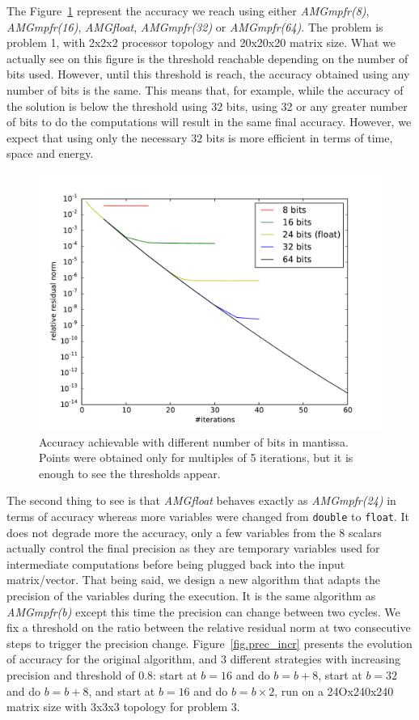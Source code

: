 \documentclass[sigplan]{acmart}
\begin{document}
   The Figure~\ref{fig.bits_accuracy} represent the accuracy we reach using either \emph{AMGmpfr(8)}, \emph{AMGmpfr(16)}, \emph{AMGfloat}, \emph{AMGmpfr(32)} or \emph{AMGmpfr(64)}. The problem is problem 1, with 2x2x2 processor topology and 20x20x20 matrix size.
   What we actually see on this figure is the threshold reachable depending on the number of bits used. However, until this threshold is reach, the accuracy obtained using any number of bits is the same. This means that, for example,
   while the accuracy of the solution is below the threshold using 32 bits, using 32 or any greater number of bits to do the computations will result in the same final accuracy. However, we expect that using only the necessary $32$ bits is 
   more efficient in terms of time, space and energy.
   
   \begin{figure} \centering
    \includegraphics[width=0.8\linewidth]{figs/bits_convergence.pdf}
    \caption{Accuracy achievable with different number of bits in mantissa. Points were obtained only for multiples of 5 iterations, but it is enough to see the thresholds appear.}
    \label{fig.bits_accuracy}
   \end{figure}
   
   The second thing to see is that \emph{AMGfloat} behaves exactly as \emph{AMGmpfr(24)} in terms of accuracy whereas more variables were changed from \texttt{double} to \texttt{float}. It does not degrade more the accuracy, only a few variables
   from the 8 scalars actually control the final precision as they are temporary variables used for intermediate computations before being plugged back into the input matrix/vector.
   That being said, we design a new algorithm that adapts the precision of the variables during the execution. It is the same algorithm as \emph{AMGmpfr(b)} except this time the precision can change between two cycles.
   We fix a threshold on the ratio between the relative residual norm at two consecutive steps to trigger the precision change.
   Figure~\ref{fig.prec_incr} presents the evolution of accuracy for the original algorithm, and 3 different strategies with increasing precision and threshold of 0.8: start at $b=16$ and do $b=b+8$, start at $b=32$
   and do $b=b+8$, and start at $b=16$ and do $b=b\times2$, run on a 24Ox240x240 matrix size with 3x3x3 topology for problem 3.
   
\end{document}
